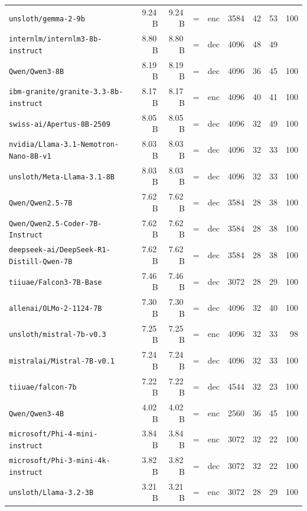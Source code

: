 \begin{longtable}{@{}llrrclrrrr@{}}
{\tiny\texttt{unsloth/gemma-2-9b}} &  & 9.24\,B & 9.24\,B & = & enc & 3584 & 42 & 53 & 100 \\
{\tiny\texttt{internlm/internlm3-8b-instruct}} &  & 8.80\,B & 8.80\,B & = & dec & 4096 & 48 & 49 &  \\
{\tiny\texttt{Qwen/Qwen3-8B}} &  & 8.19\,B & 8.19\,B & = & dec & 4096 & 36 & 45 & 100 \\
{\tiny\texttt{ibm-granite/granite-3.3-8b-instruct}} &  & 8.17\,B & 8.17\,B & = & enc & 4096 & 40 & 41 & 100 \\
{\tiny\texttt{swiss-ai/Apertus-8B-2509}} &  & 8.05\,B & 8.05\,B & = & dec & 4096 & 32 & 49 & 100 \\
{\tiny\texttt{nvidia/Llama-3.1-Nemotron-Nano-8B-v1}} &  & 8.03\,B & 8.03\,B & = & dec & 4096 & 32 & 33 & 100 \\
{\tiny\texttt{unsloth/Meta-Llama-3.1-8B}} &  & 8.03\,B & 8.03\,B & = & dec & 4096 & 32 & 33 & 100 \\
{\tiny\texttt{Qwen/Qwen2.5-7B}} &  & 7.62\,B & 7.62\,B & = & dec & 3584 & 28 & 38 & 100 \\
{\tiny\texttt{Qwen/Qwen2.5-Coder-7B-Instruct}} &  & 7.62\,B & 7.62\,B & = & dec & 3584 & 28 & 38 & 100 \\
{\tiny\texttt{deepseek-ai/DeepSeek-R1-Distill-Qwen-7B}} &  & 7.62\,B & 7.62\,B & = & dec & 3584 & 28 & 38 & 100 \\
{\tiny\texttt{tiiuae/Falcon3-7B-Base}} &  & 7.46\,B & 7.46\,B & = & dec & 3072 & 28 & 29 & 100 \\
{\tiny\texttt{allenai/OLMo-2-1124-7B}} &  & 7.30\,B & 7.30\,B & = & dec & 4096 & 32 & 40 & 100 \\
{\tiny\texttt{unsloth/mistral-7b-v0.3}} &  & 7.25\,B & 7.25\,B & = & enc & 4096 & 32 & 33 & 98 \\
{\tiny\texttt{mistralai/Mistral-7B-v0.1}} &  & 7.24\,B & 7.24\,B & = & dec & 4096 & 32 & 33 & 100 \\
{\tiny\texttt{tiiuae/falcon-7b}} &  & 7.22\,B & 7.22\,B & = & dec & 4544 & 32 & 23 & 100 \\
{\tiny\texttt{Qwen/Qwen3-4B}} &  & 4.02\,B & 4.02\,B & = & enc & 2560 & 36 & 45 & 100 \\
{\tiny\texttt{microsoft/Phi-4-mini-instruct}} &  & 3.84\,B & 3.84\,B & = & enc & 3072 & 32 & 22 & 100 \\
{\tiny\texttt{microsoft/Phi-3-mini-4k-instruct}} &  & 3.82\,B & 3.82\,B & = & dec & 3072 & 32 & 22 & 100 \\
{\tiny\texttt{unsloth/Llama-3.2-3B}} &  & 3.21\,B & 3.21\,B & = & enc & 3072 & 28 & 29 & 100 \\

\end{longtable}
